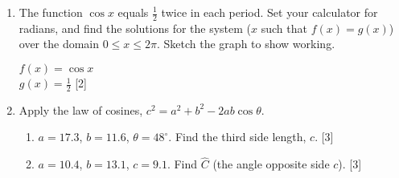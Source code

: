 \documentclass[12pt, twoside]{article}
\begin{document}
\begin{enumerate}
  \newpage
    \item The function $\cos x$ equals $\frac{1}{2}$ twice in each period. Set your calculator for radians, and find the solutions for the system ($x$ such that $f(x)=g(x)$) over the domain $0 \leq x \leq 2 \pi$. Sketch the graph to show working.
    \begin{multicols}{2}
        \qquad $f(x)=\cos x$ \\[0.25cm] $g(x)=\frac{1}{2}$ \hfill [2] \vspace{0.3cm}
    \end{multicols}

\item Apply the law of cosines, $c^2=a^2+b^2-2ab \cos \theta$.
    \begin{enumerate}
        \item $a=17.3$, $b=11.6$, $\theta = 48^\circ$. Find the third side length, $c$. \hfill [3]
        \item $a=10.4$, $b=13.1$, $c=9.1$. Find $\hat{C}$ (the angle opposite side $c$). \hfill [3]
    \end{enumerate}


\end{enumerate}
\end{document}
